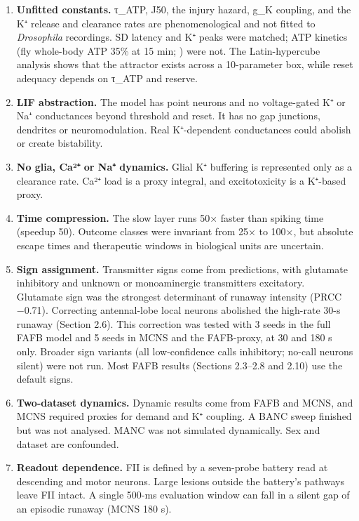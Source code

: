 \documentclass[11pt]{article}
\providecommand{\tightlist}{\setlength{\itemsep}{0pt}\setlength{\parskip}{0pt}}
\begin{document}
\begin{enumerate}
\def\labelenumi{\arabic{enumi}.}
\tightlist
\item
  \textbf{Unfitted constants.} τ\_ATP, J50, the injury hazard, g\_K coupling, and the K⁺ release and clearance rates are phenomenological and not fitted to \emph{Drosophila} recordings. SD latency and K⁺ peaks were matched; ATP kinetics (fly whole-body ATP 35\% at 15 min; \cite{campbell2018}) were not. The Latin-hypercube analysis shows that the attractor exists across a 10-parameter box, while reset adequacy depends on τ\_ATP and reserve.
\item
  \textbf{LIF abstraction.} The model has point neurons and no voltage-gated K⁺ or Na⁺ conductances beyond threshold and reset. It has no gap junctions, dendrites or neuromodulation. Real K⁺-dependent conductances could abolish or create bistability.
\item
  \textbf{No glia, Ca²⁺ or Na⁺ dynamics.} Glial K⁺ buffering \cite{andersen2026,armstrong2011} is represented only as a clearance rate. Ca²⁺ load is a proxy integral, and excitotoxicity is a K⁺-based proxy.
\item
  \textbf{Time compression.} The slow layer runs 50× faster than spiking time (speedup 50). Outcome classes were invariant from 25× to 100×, but absolute escape times and therapeutic windows in biological units are uncertain.
\item
  \textbf{Sign assignment.} Transmitter signs come from predictions, with glutamate inhibitory and unknown or monoaminergic transmitters excitatory. Glutamate sign was the strongest determinant of runaway intensity (PRCC −0.71). Correcting antennal-lobe local neurons abolished the high-rate 30-s runaway (Section 2.6). This correction was tested with 3 seeds in the full FAFB model and 5 seeds in MCNS and the FAFB-proxy, at 30 and 180 s only. Broader sign variants (all low-confidence calls inhibitory; no-call neurons silent) were not run. Most FAFB results (Sections 2.3--2.8 and 2.10) use the default signs.
\item
  \textbf{Two-dataset dynamics.} Dynamic results come from FAFB and MCNS, and MCNS required proxies for demand and K⁺ coupling. A BANC sweep finished but was not analysed. MANC was not simulated dynamically. Sex and dataset are confounded.
\item
  \textbf{Readout dependence.} FII is defined by a seven-probe battery read at descending and motor neurons. Large lesions outside the battery's pathways leave FII intact. A single 500-ms evaluation window can fall in a silent gap of an episodic runaway (MCNS 180 s).

\end{enumerate}
\end{document}
